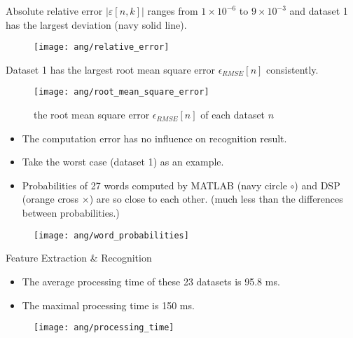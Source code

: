 
\begin{frame}
Absolute relative error $|\varepsilon[n, k]|$ ranges from $1 \times 10^{-6}$ to $9 \times 10^{-3}$ and dataset 1 has the largest deviation (\textcolor{navy_matlab}{navy solid line}).

\begin{figure}[H]
\centering
\texttt{[image: ang/relative\_error]}
\end{figure}
\end{frame}


\begin{frame}
Dataset 1 has the largest root mean square error $\epsilon_{RMSE}[n]$ consistently.

\begin{figure}[H]
\centering
\texttt{[image: ang/root\_mean\_square\_error]}
\caption{the root mean square error $\epsilon_{RMSE}[n]$ of each dataset $n$}
\end{figure}
\end{frame}


\begin{frame}
\begin{itemize}
\item The computation error has no influence on recognition result.
\item Take the worst case (dataset 1) as an example.
\item Probabilities of 27 words computed by MATLAB (\textcolor{navy_matlab}{navy circle $\circ$}) and DSP (\textcolor{orange_matlab}{orange cross $\times$}) are so close to each other. (much less than the differences between probabilities.)
\end{itemize}

\begin{figure}[H]
\centering
\texttt{[image: ang/word\_probabilities]}
\end{figure}
\end{frame}


\begin{frame}
Feature Extraction \& Recognition
\begin{itemize}
\item The average processing time of these 23 datasets is 95.8 ms.
\item The maximal processing time is 150 ms.
\end{itemize}

\begin{figure}[H]
\centering
\texttt{[image: ang/processing\_time]}
\end{figure}
\end{frame}
